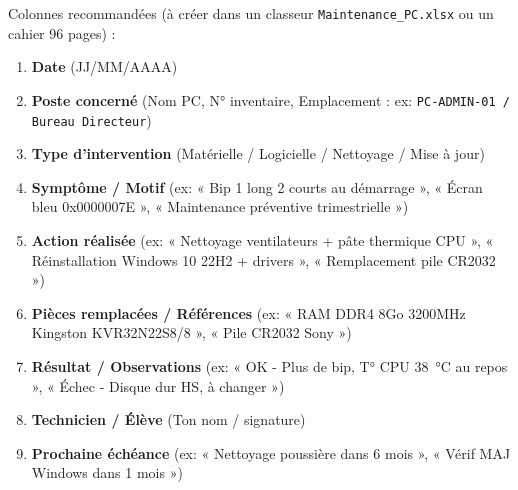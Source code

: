 \documentclass[11pt]{article}
\begin{document}
\begin{methode}
Colonnes recommandées (à créer dans un classeur \texttt{Maintenance\_PC.xlsx} ou un cahier 96 pages) :
\begin{enumerate}
    \item \textbf{Date} (JJ/MM/AAAA)
    \item \textbf{Poste concerné} (Nom PC, N° inventaire, Emplacement : ex: \texttt{PC-ADMIN-01 / Bureau Directeur})
    \item \textbf{Type d'intervention} (Matérielle / Logicielle / Nettoyage / Mise à jour)
    \item \textbf{Symptôme / Motif} (ex: « Bip 1 long 2 courts au démarrage », « Écran bleu 0x0000007E », « Maintenance préventive trimestrielle »)
    \item \textbf{Action réalisée} (ex: « Nettoyage ventilateurs + pâte thermique CPU », « Réinstallation Windows 10 22H2 + drivers », « Remplacement pile CR2032 »)
    \item \textbf{Pièces remplacées / Références} (ex: « RAM DDR4 8Go 3200MHz Kingston KVR32N22S8/8 », « Pile CR2032 Sony »)
    \item \textbf{Résultat / Observations} (ex: « OK - Plus de bip, T° CPU \SI{38}{\celsius} au repos », « Échec - Disque dur HS, à changer »)
    \item \textbf{Technicien / Élève} (Ton nom / signature)
    \item \textbf{Prochaine échéance} (ex: « Nettoyage poussière dans 6 mois », « Vérif MAJ Windows dans 1 mois »)
\end{enumerate}
\end{methode}
\end{document}
